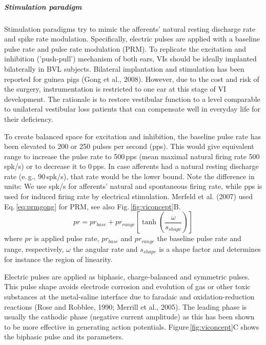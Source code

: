 \subparagraph{Stimulation paradigm}
Stimulation paradigms try to mimic the afferents' natural resting discharge rate and spike rate modulation. Specifically, electric pulses are applied with a baseline pulse rate and pulse rate modulation (PRM). To replicate the excitation and inhibition ('push-pull') mechanism of both ears, VIs should be ideally implanted bilaterally in BVL subjects. Bilateral implantation and stimulation has been reported for guinea pigs (Gong et al., 2008). However, due to the cost and risk of the surgery, instrumentation is restricted to one ear at this stage of VI development. The rationale is to restore vestibular function to a level comparable to unilateral vestibular loss patients that can compensate well in everyday life for their deficiency.

To create balanced space for excitation and inhibition, the baseline pulse rate has been elevated to 200 or 250 pulses per second (pps). This would give equivalent range to increase the pulse rate to 500\,pps (mean maximal natural firing rate 500\,spk/s) or to decrease it to 0\,pps. In case afferents had a natural resting discharge rate (e.\,g., 90\,spk/s), that rate would be the lower bound. Note the difference in units: We use spk/s for afferents' natural and spontaneous firing rate, while pps is used for induced firing rate by electrical stimulation. Merfeld et al. (2007) used Eq.\,\eqref{eq:prmgong} for PRM, see also Fig.\,\ref{fig:viconcept}B.
\begin{equation}\label{eq:prmgong}
pr = pr_{base} + pr_{range}\left[\tanh\left(\frac{\omega}{s_{shape}}\right)\right]
\end{equation}
where $pr$ is applied pulse rate, $pr_{base}$ and $pr_{range}$ the baseline pulse rate and range, respectively, $\omega$ the angular rate and $s_{shape}$ is a shape factor and determines for instance the region of linearity.

Electric pulses are applied as biphasic, charge-balanced and symmetric pulses. This pulse shape avoids electrode corrosion and evolution of gas or other toxic substances at the metal-saline interface due to faradaic and oxidation-reduction reactions (Rose and Robblee, 1990; Merrill et al., 2005). The leading phase is usually the cathodic phase (negative current amplitude) as this has been shown to be more effective in generating action potentials. Figure\,\ref{fig:viconcept}C shows the biphasic pulse and its parameters. 

